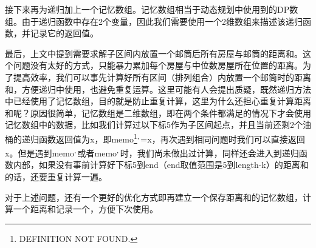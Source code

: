\documentclass[9pt, b5paaper]{book}
\begin{document}
接下来再为递归加上一个记忆数组。记忆数组相当于动态规划中使用到的DP数组。由于递归函数中存在2个变量，因此我们需要使用一个2维数组来描述该递归函数，并记录它的返回值。

最后，上文中提到需要求解子区间内放置一个邮筒后所有房屋与邮筒的距离和。这个问题没有太好的方式，只能暴力累加每个房屋与中位数房屋所在位置的距离。为了提高效率，我们可以事先计算好所有区间（排列组合）内放置一个邮筒时的距离和，方便递归中使用，也避免重复运算。这里可能有人会提出质疑，既然递归方法中已经使用了记忆数组，目的就是防止重复计算，这里为什么还担心重复计算距离和呢？原因很简单，记忆数组是二维数组，即在两个条件都满足的情况下才会使用记忆数组中的数据，比如我们计算过以下标5作为子区间起点，并且当前还剩2个油桶的递归函数返回值为x，即memo\footnote{DEFINITION NOT FOUND.}\textsuperscript{,}\,\footnotemark[3]{}=x，再次遇到相同问题时我们可以直接返回x。但是遇到memo\footnotemark[5]{}\textsuperscript{,}\,\footnotemark[2]{}或者memo\footnotemark[5]{}\textsuperscript{,}\,\footnotemark[4]{}时，我们尚未做出过计算，同样还会进入到递归函数内部，如果没有事前计算好下标5到end（end取值范围是5到length-k）的距离和的话，还要重复计算一遍。

对于上述问题，还有一个更好的优化方式即再建立一个保存距离和的记忆数组，计算一个距离和记录一个，方便下次使用。
\end{document}

